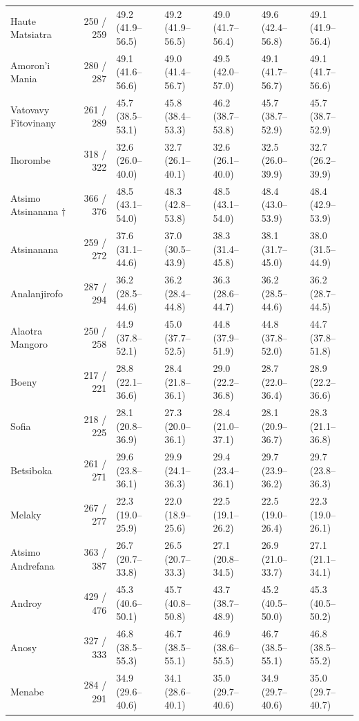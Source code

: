 \documentclass[11pt,a4paper]{article}
\begin{document}
\begin{landscape}
\begin{longtable}{l|rlllll}
Haute Matsiatra & 250 / 259 & 49.2 (41.9–56.5) & 49.2 (41.9–56.5) & 49.0 (41.7–56.4) & 49.6 (42.4–56.8) & 49.1 (41.9–56.4) \\ 
Amoron'i Mania & 280 / 287 & 49.1 (41.6–56.6) & 49.0 (41.4–56.7) & 49.5 (42.0–57.0) & 49.1 (41.7–56.7) & 49.1 (41.7–56.6) \\ 
Vatovavy Fitovinany & 261 / 289 & 45.7 (38.5–53.1) & 45.8 (38.4–53.3) & 46.2 (38.7–53.8) & 45.7 (38.7–52.9) & 45.7 (38.7–52.9) \\ 
Ihorombe & 318 / 322 & 32.6 (26.0–40.0) & 32.7 (26.1–40.1) & 32.6 (26.1–40.0) & 32.5 (26.0–39.9) & 32.7 (26.2–39.9) \\ 
Atsimo Atsinanana $\dagger$ & 366 / 376 & 48.5 (43.1–54.0) & 48.3 (42.8–53.8) & 48.5 (43.1–54.0) & 48.4 (43.0–53.9) & 48.4 (42.9–53.9) \\ 
Atsinanana & 259 / 272 & 37.6 (31.1–44.6) & 37.0 (30.5–43.9) & 38.3 (31.4–45.8) & 38.1 (31.7–45.0) & 38.0 (31.5–44.9) \\ 
Analanjirofo & 287 / 294 & 36.2 (28.5–44.6) & 36.2 (28.4–44.8) & 36.3 (28.6–44.7) & 36.2 (28.5–44.6) & 36.2 (28.7–44.5) \\ 
Alaotra Mangoro & 250 / 258 & 44.9 (37.8–52.1) & 45.0 (37.7–52.5) & 44.8 (37.9–51.9) & 44.8 (37.8–52.0) & 44.7 (37.8–51.8) \\ 
Boeny & 217 / 221 & 28.8 (22.1–36.6) & 28.4 (21.8–36.1) & 29.0 (22.2–36.8) & 28.7 (22.0–36.4) & 28.9 (22.2–36.6) \\ 
Sofia & 218 / 225 & 28.1 (20.8–36.9) & 27.3 (20.0–36.1) & 28.4 (21.0–37.1) & 28.1 (20.9–36.7) & 28.3 (21.1–36.8) \\ 
Betsiboka & 261 / 271 & 29.6 (23.8–36.1) & 29.9 (24.1–36.3) & 29.4 (23.4–36.1) & 29.7 (23.9–36.2) & 29.7 (23.8–36.3) \\ 
Melaky & 267 / 277 & 22.3 (19.0–25.9) & 22.0 (18.9–25.6) & 22.5 (19.1–26.2) & 22.5 (19.0–26.4) & 22.3 (19.0–26.1) \\ 
Atsimo Andrefana & 363 / 387 & 26.7 (20.7–33.8) & 26.5 (20.7–33.3) & 27.1 (20.8–34.5) & 26.9 (21.0–33.7) & 27.1 (21.1–34.1) \\ 
Androy & 429 / 476 & 45.3 (40.6–50.1) & 45.7 (40.8–50.8) & 43.7 (38.7–48.9) & 45.2 (40.5–50.0) & 45.3 (40.5–50.2) \\ 
Anosy & 327 / 333 & 46.8 (38.5–55.3) & 46.7 (38.5–55.1) & 46.9 (38.6–55.5) & 46.7 (38.5–55.1) & 46.8 (38.5–55.2) \\ 
Menabe & 284 / 291 & 34.9 (29.6–40.6) & 34.1 (28.6–40.1) & 35.0 (29.7–40.6) & 34.9 (29.7–40.6) & 35.0 (29.7–40.7) \\ 

\end{longtable}
\end{landscape}
\end{document}
